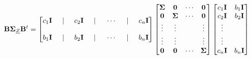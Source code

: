 \documentclass[
]{book}
\theoremstyle{definition}
\theoremstyle{definition}
\theoremstyle{definition}
\theoremstyle{definition}
\theoremstyle{remark}
\begin{document}
\begin{align*}
 \mathbf{B}\mathbf{\Sigma}_{\underline{Z}} \mathbf{B}^t&=
\begin{bmatrix}
 c_1\mathbf{I} \hspace{0.5cm}| \hspace{0.5cm} c_2\mathbf{I}  \hspace{0.5cm}| \hspace{0.5cm} \cdots  \hspace{0.5cm}| \hspace{0.5cm} c_n\mathbf{I} \\ \\ 
  b_1\mathbf{I} \hspace{0.5cm}| \hspace{0.5cm} b_2\mathbf{I}  \hspace{0.5cm}| \hspace{0.5cm} \cdots  \hspace{0.5cm}| \hspace{0.5cm} b_n\mathbf{I}
\end{bmatrix}
\begin{bmatrix}
\mathbf{\Sigma} & \mathbf{0} & \cdots & \mathbf{0}\\
\mathbf{0} & \mathbf{\Sigma} & \cdots & \mathbf{0}\\
\vdots & \vdots &  & \vdots \\
\vdots & \vdots &  & \vdots \\
\mathbf{0} & \mathbf{0} & \cdots &  \mathbf{\Sigma}
\end{bmatrix}
\begin{bmatrix}
c_1\mathbf{I} & b_1\mathbf{I} \\ c_2\mathbf{I} &b_2 \mathbf{I} \\ \vdots \\ \vdots \\ c_n\mathbf{I} & b_n \mathbf{I}
\end{bmatrix}  
\end{align*}
\end{document}
